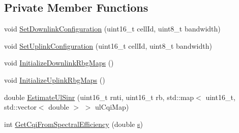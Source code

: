 \subsection*{Private Member Functions}
\begin{DoxyCompactItemize}
\item 
void \hyperlink{classns3_1_1LteFfrEnhancedAlgorithm_a31acc239f3b310e791d132db29ff2c80}{Set\+Downlink\+Configuration} (uint16\+\_\+t cell\+Id, uint8\+\_\+t bandwidth)
\item 
void \hyperlink{classns3_1_1LteFfrEnhancedAlgorithm_ab4cc6a7d1d40a45058ccafe95a81a15c}{Set\+Uplink\+Configuration} (uint16\+\_\+t cell\+Id, uint8\+\_\+t bandwidth)
\item 
void \hyperlink{classns3_1_1LteFfrEnhancedAlgorithm_a379506a432a4414a394622bca49f4293}{Initialize\+Downlink\+Rbg\+Maps} ()
\item 
void \hyperlink{classns3_1_1LteFfrEnhancedAlgorithm_ae0a8e76f10168c1cfc550c541097282e}{Initialize\+Uplink\+Rbg\+Maps} ()
\item 
double \hyperlink{classns3_1_1LteFfrEnhancedAlgorithm_a4a13b94cc7e250a9111515c5e0bba247}{Estimate\+Ul\+Sinr} (uint16\+\_\+t rnti, uint16\+\_\+t rb, std\+::map$<$ uint16\+\_\+t, std\+::vector$<$ double $>$ $>$ ul\+Cqi\+Map)
\item 
int \hyperlink{classns3_1_1LteFfrEnhancedAlgorithm_aa72c07ec45c605f8d44d751e9b9b6280}{Get\+Cqi\+From\+Spectral\+Efficiency} (double \hyperlink{generate__test__data__lte__sinr_8m_ad83eeb3a142285d1243a08c6b7026df8}{s})
\end{DoxyCompactItemize}
